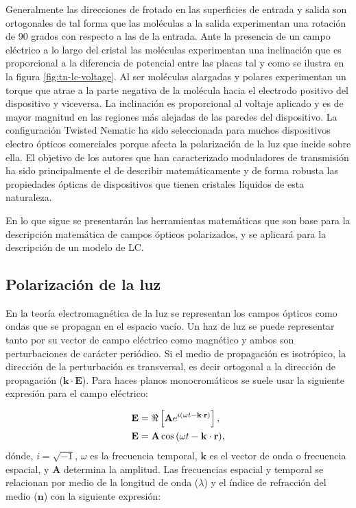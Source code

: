 Generalmente las direcciones de frotado en las superficies de entrada
y salida son ortogonales de tal forma que las moléculas a la salida experimentan
una rotación de 90 grados con respecto a las de la entrada. Ante la
presencia de un campo eléctrico a lo largo del cristal las moléculas
experimentan una inclinación que es proporcional a la diferencia de
potencial entre las placas tal y como se ilustra en la figura
\ref{fig:tn-lc-voltage}. Al ser moléculas alargadas y polares
experimentan un torque que atrae a la parte negativa de la molécula
hacia el electrodo positivo del  dispositivo y viceversa. La
inclinación es proporcional al voltaje aplicado y es de mayor magnitud
en las regiones más alejadas de las paredes del dispositivo. La
configuración Twisted Nematic ha sido seleccionada para muchos
dispositivos electro ópticos comerciales porque afecta 
la polarización de la luz que incide sobre ella. El objetivo de los
autores que han caracterizado moduladores de transmisión ha sido
principalmente el de describir matemáticamente y de forma robusta las
propiedades ópticas de dispositivos que tienen cristales líquidos de esta naturaleza. 

En lo que sigue se presentarán las herramientas matemáticas que son
base para la descripción matemática de campos ópticos polarizados, y
se aplicará para la descripción de un modelo de LC.

\subsection{Polarización de la luz}

En la teoría electromagnética de la luz se representan los campos
ópticos como ondas que se propagan en el espacio vacío. Un haz de luz
se puede representar tanto por su vector de campo eléctrico como
magnético y ambos son perturbaciones de carácter periódico. Si el
medio de propagación es isotrópico, la dirección de la perturbación 
es transversal, es decir ortogonal a la dirección de propagación
($\mathbf{k}\cdot\mathbf{E}$). Para haces planos monocromáticos se
suele usar la siguiente expresión para el campo eléctrico:  

\begin{align}
\mathbf{E} &=\Re\left[\mathbf{A}e^{i\left( \omega t -\mathbf{k}\cdot \mathbf{r}\right)}\right]\label{eq:complex_field},\\
\mathbf{E} &=\mathbf{A}\cos{ \left(\omega t -\mathbf{k}\cdot
    \mathbf{r}\right)},\notag
\end{align}
dónde, $i = \sqrt{-1}$, $\omega$ es la frecuencia temporal, $\mathbf{k}$ es el vector de
onda o frecuencia espacial, y $\mathbf{A}$ determina la amplitud.
Las frecuencias espacial y temporal se relacionan por medio de la
longitud de onda  ($\lambda$) y el índice de refracción del medio ($\mathbf{n}$) con la
siguiente expresión:


